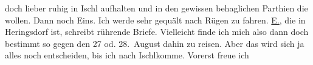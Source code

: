                doch lieber ruhig in Ischl aufhalten und in den
               gewissen behaglichen Parthien die \label{K_L03160-3v}\label{K_L03160-3} wollen. Dann {\pb}noch Eins. Ich werde sehr
               gequält nach Rügen zu fahren. \uline{E.}, die in Heringsdorf ist, schreibt
               rührende Briefe. Vielleicht finde ich mich also dann doch bestimmt so gegen den 27 od. 28. August dahin zu
               reisen. Aber das wird sich ja alles noch
               entscheiden, bis ich nach Ischlkomme. Vorerst freue ich
